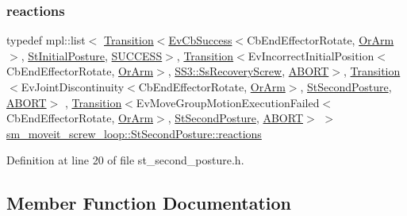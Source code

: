 \subsubsection{\texorpdfstring{reactions}{reactions}}
{\footnotesize\ttfamily typedef mpl\+::list$<$ \hyperlink{classsmacc_1_1Transition}{Transition}$<$\hyperlink{structsmacc_1_1EvCbSuccess}{Ev\+Cb\+Success}$<$Cb\+End\+Effector\+Rotate, \hyperlink{classsm__moveit__screw__loop_1_1OrArm}{Or\+Arm}$>$, \hyperlink{structsm__moveit__screw__loop_1_1StInitialPosture}{St\+Initial\+Posture}, \hyperlink{structsmacc_1_1default__transition__tags_1_1SUCCESS}{S\+U\+C\+C\+E\+SS}$>$, \hyperlink{classsmacc_1_1Transition}{Transition}$<$Ev\+Incorrect\+Initial\+Position$<$Cb\+End\+Effector\+Rotate, \hyperlink{classsm__moveit__screw__loop_1_1OrArm}{Or\+Arm}$>$, \hyperlink{structsm__moveit__screw__loop_1_1SS3_1_1SsRecoveryScrew}{S\+S3\+::\+Ss\+Recovery\+Screw}, \hyperlink{structsmacc_1_1default__transition__tags_1_1ABORT}{A\+B\+O\+RT}$>$, \hyperlink{classsmacc_1_1Transition}{Transition}$<$Ev\+Joint\+Discontinuity$<$Cb\+End\+Effector\+Rotate, \hyperlink{classsm__moveit__screw__loop_1_1OrArm}{Or\+Arm}$>$, \hyperlink{structsm__moveit__screw__loop_1_1StSecondPosture}{St\+Second\+Posture}, \hyperlink{structsmacc_1_1default__transition__tags_1_1ABORT}{A\+B\+O\+RT}$>$ , \hyperlink{classsmacc_1_1Transition}{Transition}$<$Ev\+Move\+Group\+Motion\+Execution\+Failed$<$Cb\+End\+Effector\+Rotate, \hyperlink{classsm__moveit__screw__loop_1_1OrArm}{Or\+Arm}$>$, \hyperlink{structsm__moveit__screw__loop_1_1StSecondPosture}{St\+Second\+Posture}, \hyperlink{structsmacc_1_1default__transition__tags_1_1ABORT}{A\+B\+O\+RT}$>$ $>$ \hyperlink{structsm__moveit__screw__loop_1_1StSecondPosture_abe50ca14852e84d2f241dde5511bf280}{sm\+\_\+moveit\+\_\+screw\+\_\+loop\+::\+St\+Second\+Posture\+::reactions}}



Definition at line 20 of file st\+\_\+second\+\_\+posture.\+h.



\subsection{Member Function Documentation}
\mbox{\label{structsm__moveit__screw__loop_1_1StSecondPosture_aa8f8702818aff4bba59cd992165b0d0e}} 
